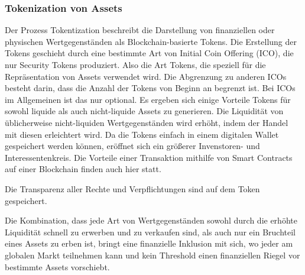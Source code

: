 \subsubsection{Tokenization von Assets}
\label{sec:Tokenization}
Der Prozess Tokentization beschreibt die Darstellung von finanziellen oder physischen
Wertgegenständen als Blockchain-basierte Tokens. Die Erstellung der Tokens geschieht durch 
eine bestimmte Art von Initial Coin Offering (ICO), die nur Security Tokens produziert. Also die Art Tokens,
die speziell für die Repräsentation von Assets verwendet wird.
\cite[p.~82]{gupta2020tokenization}
Die Abgrenzung zu anderen ICOs besteht darin, dass die Anzahl der Tokens von Beginn an begrenzt ist.
Bei ICOs im Allgemeinen ist das nur optional.
\cite[p.66]{fill2020blockchain}
Es ergeben sich einige Vorteile Tokens für sowohl liquide als auch nicht-liquide Assets zu generieren.
Die Liquidität von üblicherweise nicht-liquiden Wertgegenständen wird erhöht, indem der Handel mit
diesen erleichtert wird. 
Da die Tokens einfach in einem digitalen Wallet gespeichert werden können, eröffnet sich ein größerer 
Invenstoren- und Interessentenkreis. 
Die Vorteile einer Transaktion mithilfe von Smart Contracts auf einer Blockchain finden auch hier 
statt. %

Die Transparenz aller Rechte und Verpflichtungen sind auf dem Token gespeichert.

\cite[p.~82]{gupta2020tokenization}

Die Kombination, dass jede Art von Wertgegenständen sowohl durch die erhöhte Liquidität schnell zu erwerben 
und zu verkaufen sind, als auch nur ein Bruchteil eines Assets zu erben ist, bringt eine 
finanzielle Inklusion mit sich, wo jeder am globalen Markt teilnehmen kann und kein Threshold einen
finanziellen Riegel vor bestimmte Assets vorschiebt.
\cite[p.~167]{chowdhary2025smart}







